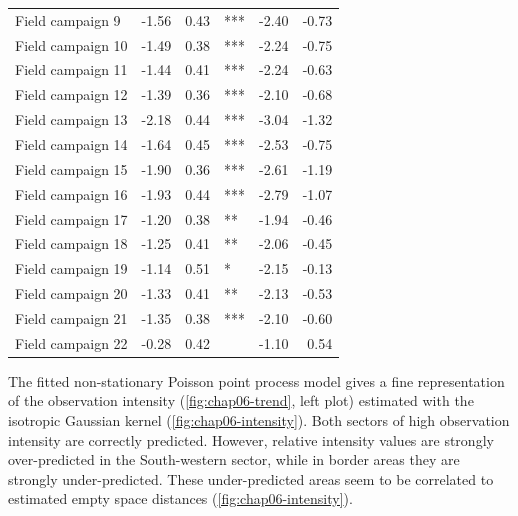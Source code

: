 \begin{table}[!ht]
\begin{tabular}{lrrlrr}
  Field campaign 9	& -1.56 	& 0.43 			& *** 	& -2.40 	& -0.73 \\ 
  Field campaign 10	& -1.49 	& 0.38 			& *** 	& -2.24 	& -0.75 \\ 
  Field campaign 11	& -1.44 	& 0.41 			& *** 	& -2.24 	& -0.63 \\ 
  Field campaign 12	& -1.39 	& 0.36 			& *** 	& -2.10 	& -0.68 \\ 
  Field campaign 13	& -2.18 	& 0.44 			& *** 	& -3.04 	& -1.32 \\ 
  Field campaign 14	& -1.64 	& 0.45 			& *** 	& -2.53 	& -0.75 \\ 
  Field campaign 15	& -1.90 	& 0.36 			& *** 	& -2.61 	& -1.19 \\ 
  Field campaign 16	& -1.93 	& 0.44 			& *** 	& -2.79 	& -1.07 \\ 
  Field campaign 17	& -1.20 	& 0.38 			& ** 	& -1.94 	& -0.46 \\ 
  Field campaign 18	& -1.25 	& 0.41			& ** 	& -2.06 	& -0.45 \\ 
  Field campaign 19	& -1.14 	& 0.51 			& * 	& -2.15 	& -0.13 \\ 
  Field campaign 20	& -1.33 	& 0.41 			& ** 	& -2.13 	& -0.53 \\ 
  Field campaign 21	& -1.35 	& 0.38 			& *** 	& -2.10 	& -0.60 \\ 
  Field campaign 22	& -0.28 	& 0.42 			&    	& -1.10 	& 0.54 	\\ 
  \hline
 \end{tabular}
\end{table}

The fitted non-stationary Poisson point process model gives a fine representation of the observation intensity 
(\autoref{fig:chap06-trend}, left plot) estimated with the isotropic Gaussian kernel 
(\autoref{fig:chap06-intensity}). Both sectors of high observation intensity are correctly predicted. However, 
relative intensity values are strongly over-predicted in the South-western sector, while in border areas they 
are strongly under-predicted. These under-predicted areas seem to be correlated to estimated empty space 
distances (\autoref{fig:chap06-intensity}).

